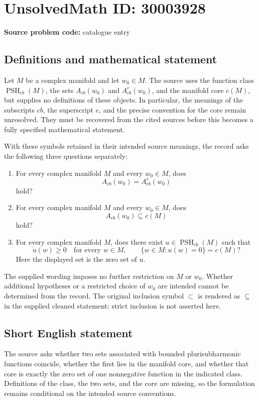 \documentclass[11pt]{article}
\begin{document}
\section*{UnsolvedMath ID: 30003928}
\textbf{Source problem code:} catalogue entry
\subsection{Definitions and mathematical statement}
Let \(M\) be a complex manifold and let \(w_0\in M\). The source uses the function class \(\operatorname{PSH}_{cb}(M)\), the sets \(A_{cb}(w_0)\) and \(A_{cb}^{e}(w_0)\), and the manifold core \(c(M)\), but supplies no definitions of these objects. In particular, the meanings of the subscripts \(cb\), the superscript \(e\), and the precise convention for the core remain unresolved. They must be recovered from the cited sources before this becomes a fully specified mathematical statement.

With these symbols retained in their intended source meanings, the record asks the following three questions separately:
\begin{enumerate}
\item For every complex manifold \(M\) and every \(w_0\in M\), does
\[
A_{cb}(w_0)=A_{cb}^{e}(w_0)
\]
hold?
\item For every complex manifold \(M\) and every \(w_0\in M\), does
\[
A_{cb}(w_0)\subseteq c(M)
\]
hold?
\item For every complex manifold \(M\), does there exist \(u\in\operatorname{PSH}_{cb}(M)\) such that
\[
u(w)\geq 0\quad\text{for every }w\in M,
\qquad
\{w\in M:u(w)=0\}=c(M)?
\]
Here the displayed set is the zero set of \(u\).
\end{enumerate}
The supplied wording imposes no further restriction on \(M\) or \(w_0\). Whether additional hypotheses or a restricted choice of \(w_0\) are intended cannot be determined from the record. The original inclusion symbol \(\subset\) is rendered as \(\subseteq\) in the supplied cleaned statement; strict inclusion is not asserted here.
\subsection{Short English statement}
The source asks whether two sets associated with bounded plurisubharmonic functions coincide, whether the first lies in the manifold core, and whether that core is exactly the zero set of one nonnegative function in the indicated class. Definitions of the class, the two sets, and the core are missing, so the formulation remains conditional on the intended source conventions.
\end{document}
